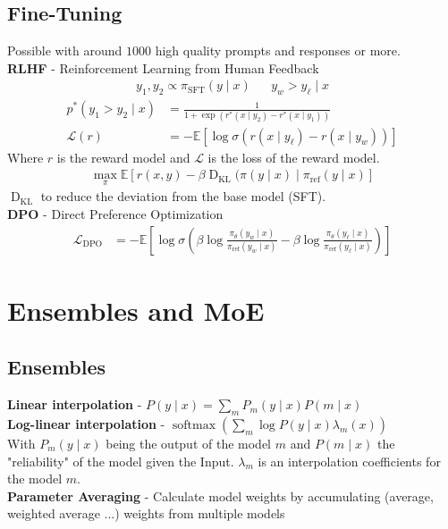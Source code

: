 \begin{multicols}{2}
\begin{mdframed}[style=eqbox]
        \subsection{Fine-Tuning}
        Possible with around $1000$ high quality prompts and responses or more.\\
        \textbf{RLHF} - Reinforcement Learning from Human Feedback
        \begin{align*}
            y_1,y_2 \propto \pi_{\mathrm{SFT}}(y \mid x) && y_w > y_\ell \mid x
        \end{align*}
        \vspace{-2em}
        \begin{align*}
            p^*(y_1 > y_2 \mid x) &= \frac{1}{1 + \exp(r^*(x \mid y_2) - r^*(x \mid y_1))}\\
            \mathcal{L}(r) &= - \mathbb{E} \left[\log\sigma (r(x \mid y_\ell) - r(x \mid y_w)) \right]
        \end{align*}
        {\tiny Where $r$ is the reward model and $\mathcal{L}$ is the loss of the reward model.}
        \begin{align*}
            \max_\pi \mathbb{E}\left[r(x,y) - \beta \operatorname{D}_\mathrm{KL} (\pi(y \mid x) \mid \pi_\mathrm{ref} (y \mid x)\right]
        \end{align*}
        {\tiny $\operatorname{D}_\mathrm{KL}$ to reduce the deviation from the base model (SFT).\\}
        \textbf{DPO} - Direct Preference Optimization
        \begin{align*}
            \mathcal{L}_\mathrm{DPO} &= - \mathbb{E} \left[ \log \sigma \left( \beta \log \frac{\pi_\theta (y_w \mid x)}{\pi_\mathrm{ref} (y_w \mid x)} - \beta \log \frac{\pi_\theta (y_\ell \mid x)}{\pi_\mathrm{ref} (y_\ell \mid x)} \right) \right]
        \end{align*}
    \end{mdframed}

    \section{Ensembles and MoE}
    \begin{mdframed}[style=eqbox]
        \subsection{Ensembles}
        \textbf{Linear interpolation} - $P(y \mid x) = \sum_m P_m(y \mid x) P(m \mid x)$\\
        \textbf{Log-linear interpolation} - $\operatorname{softmax}\left(\sum_m \log P(y \mid x) \lambda_m(x)\right)$\\
        With $P_m(y \mid x)$ being the output of the model $m$ and $P(m \mid x)$ the "reliability" of the model given the Input. $\lambda_m$ is an interpolation coefficients for the model $m$.\\
        \textbf{Parameter Averaging} - Calculate model weights by accumulating (average, weighted average ...) weights from multiple models
    \end{mdframed}
    \newpage


\end{multicols}

